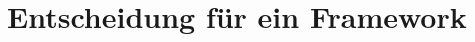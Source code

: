 \documentclass[ngerman]{article}
\begin{document}
    \section{Entscheidung für ein Framework}
    \label{Entscheidung}
    \newpage\noindent
\end{document}
